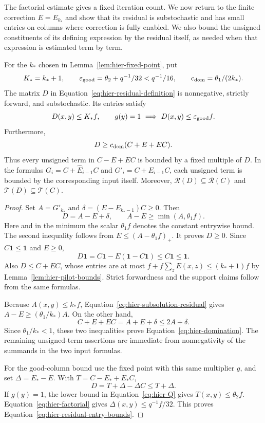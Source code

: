The factorial estimate gives a fixed iteration count.  We now return to
the finite correction $E=E_{k_*}$ and show that its residual is
substochastic and has small entries on columns where correction is fully
enabled.  We also bound the unsigned constituents of its defining
expression by the residual itself, as needed when that expression is
estimated term by term.

\begin{lemma}
\label{lem:hier-residual}
For the $k_*$ chosen in Lemma~\ref{lem:hier-fixed-point}, put
\[
 K_*=k_*+1,\qquad
 \varepsilon_{\rm good}=\theta_2+q^{-1}/32<q^{-1}/16,
 \qquad c_{\rm dom}=\theta_1/(2k_*).
\]
The matrix $D$ in Equation~\eqref{eq:hier-residual-definition} is
nonnegative, strictly forward, and substochastic.  Its entries satisfy
\begin{equation}
 D(x,y)\leq K_*f,
 \qquad
 g(y)=1\ \Longrightarrow\ D(x,y)\leq\varepsilon_{\rm good}f.
 \label{eq:hier-residual-entry-bounds}
\end{equation}
Furthermore,
\begin{equation}
 D\geq c_{\rm dom}(C+E+EC).
 \label{eq:hier-domination}
\end{equation}
Thus every unsigned term in $C-E+EC$ is bounded by a fixed multiple
of $D$.  In the formulas $G_i=C+\widehat E_{i-1}C$ and
$G'_i=C+E_{i-1}C$, each unsigned term is bounded by the corresponding
input itself.  Moreover,
$\mathcal R(D)\subseteq\mathcal R(C)$ and
$\mathcal T(D)\subseteq\mathcal T(C)$.
\end{lemma}

\begin{proof}
Set $A=G'_{k_*}$ and
$\delta=(E-E_{k_*-1})C\geq0$.  Then
\begin{equation}
 D=A-E+\delta,
 \qquad A-E\geq\min(A,\theta_1f).
 \label{eq:hier-subsolution-residual}
\end{equation}
Here and in the minimum the scalar $\theta_1f$ denotes the constant
entrywise bound.  The second inequality follows from
$E\leq(A-\theta_1f)_+$.  It proves $D\geq0$.
Since $C\mathbf 1\leq\mathbf 1$ and $E\geq0$,
\[
 D\mathbf 1=C\mathbf 1-E(\mathbf 1-C\mathbf 1)
       \leq C\mathbf 1\leq\mathbf 1.
\]
Also $D\leq C+EC$, whose entries are at most
$f+f\sum_z E(x,z)\leq(k_*+1)f$ by
Lemma~\ref{lem:hier-pilot-bounds}.  Strict forwardness and the support
claims follow from the same formulas.

Because $A(x,y)\leq k_*f$, Equation~\eqref{eq:hier-subsolution-residual}
gives $A-E\geq(\theta_1/k_*)A$.  On the other hand,
\[
 C+E+EC=A+E+\delta\leq2A+\delta.
\]
Since $\theta_1/k_*<1$, these two inequalities prove
Equation~\eqref{eq:hier-domination}.  The remaining unsigned-term
assertions are immediate from nonnegativity of the summands in the two
input formulas.

For the good-column bound use the fixed point with this same multiplier
$g$, and set $\Delta=E_*-E$.  With $T=C-E_*+E_*C$,
\[
 D=T+\Delta-\Delta C\leq T+\Delta.
\]
If $g(y)=1$, the lower bound in Equation~\eqref{eq:hier-Q} gives
$T(x,y)\leq\theta_2f$.  Equation~\eqref{eq:hier-factorial} gives
$\Delta(x,y)\leq q^{-1}f/32$.  This proves
Equation~\eqref{eq:hier-residual-entry-bounds}.
\end{proof}

